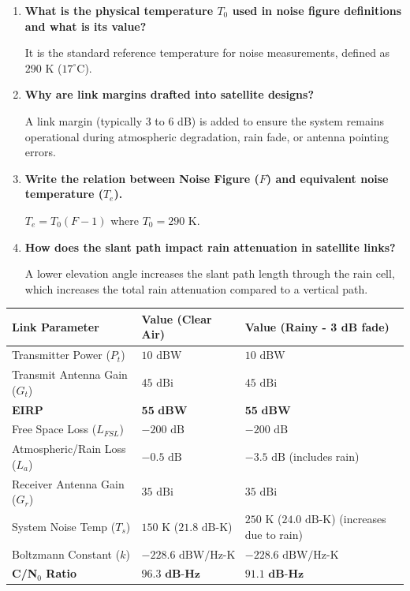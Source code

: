 \documentclass[12pt,a4paper]{article}
\newcommand{\Q}[1]{\textbf{#1}\par\noindent\ignorespaces}
\renewcommand{\arraystretch}{1.45}
\begin{document}
\begin{tcolorbox}[exambox, title={\textbf{Frequently Asked / Viva Questions}}]
\begin{enumerate}[topsep=0pt, label=\textbf{Q\arabic*.}, itemsep=5pt]
  \item \Q{What is the physical temperature $T_0$ used in noise figure definitions and what is its value?}
    It is the standard reference temperature for noise measurements, defined as $290\text{ K}$ ($17^\circ\text{C}$).
  \item \Q{Why are link margins drafted into satellite designs?}
    A link margin (typically 3 to 6 dB) is added to ensure the system remains operational during atmospheric degradation, rain fade, or antenna pointing errors.
  \item \Q{Write the relation between Noise Figure ($F$) and equivalent noise temperature ($T_e$).}
    $T_e = T_0(F - 1)$ where $T_0 = 290\text{ K}$.
  \item \Q{How does the slant path impact rain attenuation in satellite links?}
    A lower elevation angle increases the slant path length through the rain cell, which increases the total rain attenuation compared to a vertical path.
\end{enumerate}
\end{tcolorbox}

\begin{tcolorbox}[tikzbox, title={Drafting a Sample Link Budget Table}]
\renewcommand{\arraystretch}{1.4}
\par\noindent
{\renewcommand{\arraystretch}{1.65}%
\begin{tabularx}{\linewidth}{|B{3.5cm}|Y|Y|}\hline
\textbf{Link Parameter} & \textbf{Value (Clear Air)} & \textbf{Value (Rainy - 3 dB fade)} \\
\hline
Transmitter Power ($P_t$) & $10 \text{ dBW}$ & $10 \text{ dBW}$ \\[4pt]
\hline
Transmit Antenna Gain ($G_t$) & $45 \text{ dBi}$ & $45 \text{ dBi}$ \\[4pt]
\hline
\textbf{EIRP} & $\mathbf{55 \text{ dBW}}$ & $\mathbf{55 \text{ dBW}}$ \\[4pt]
\hline
Free Space Loss ($L_{FSL}$) & $-200 \text{ dB}$ & $-200 \text{ dB}$ \\[4pt]
\hline
Atmospheric/Rain Loss ($L_a$) & $-0.5 \text{ dB}$ & $-3.5 \text{ dB}$ (includes rain) \\[4pt]
\hline
Receiver Antenna Gain ($G_r$) & $35 \text{ dBi}$ & $35 \text{ dBi}$ \\[4pt]
\hline
System Noise Temp ($T_s$) & $150 \text{ K}$ ($21.8 \text{ dB-K}$) & $250 \text{ K}$ ($24.0 \text{ dB-K}$) (increases due to rain) \\[4pt]
\hline
Boltzmann Constant ($k$) & $-228.6 \text{ dBW/Hz-K}$ & $-228.6 \text{ dBW/Hz-K}$ \\
\hline
\textbf{C/N$_0$ Ratio} & $\mathbf{96.3 \text{ dB-Hz}}$ & $\mathbf{91.1 \text{ dB-Hz}}$ \\[4pt]
\hline
\end{tabularx}
}
\end{tcolorbox}
\end{document}
